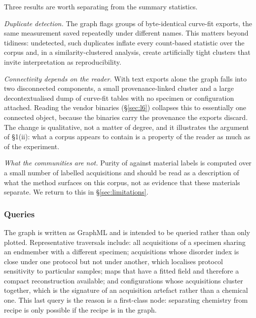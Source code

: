 Three results are worth separating from the summary statistics.

\emph{Duplicate detection.} The graph flags \Ndupgroups{} groups of
byte-identical curve-fit exports, the same measurement saved repeatedly under
different names. This matters beyond tidiness: undetected, such duplicates
inflate every count-based statistic over the corpus and, in a
similarity-clustered analysis, create artificially tight clusters that invite
interpretation as reproducibility.

\emph{Connectivity depends on the reader.} With text exports alone the graph
falls into two disconnected components, a small provenance-linked cluster and a
large decontextualised dump of curve-fit tables with no specimen or
configuration attached. Reading the vendor binaries (\S\ref{sec:l6}) collapses
this to essentially one connected object, because the binaries carry the
provenance the exports discard. The change is qualitative, not a matter of
degree, and it illustrates the argument of \S1(ii): what a corpus appears to
contain is a property of the reader as much as of the experiment.

\emph{What the communities are not.} Purity of \KGpurity{} against material
labels is computed over a small number of labelled acquisitions and should be
read as a description of what the method surfaces on this corpus, not as
evidence that these materials separate. We return to this in
\S\ref{sec:limitations}.

\subsubsection{Queries}

The graph is written as GraphML and is intended to be queried rather than only
plotted. Representative traversals include: all acquisitions of a specimen
sharing an endmember with a different specimen; acquisitions whose disorder
index is close under one protocol but not under another, which localises
protocol sensitivity to particular samples; maps that have a fitted field and
therefore a compact reconstruction available; and configurations whose
acquisitions cluster together, which is the signature of an acquisition
artefact rather than a chemical one. This last query is the reason
 is a first-class node: separating chemistry from recipe is only
possible if the recipe is in the graph.

\begin{table}[t]\centering\small
\caption{Knowledge-graph summary.}\label{tab:kg}
\end{table}

